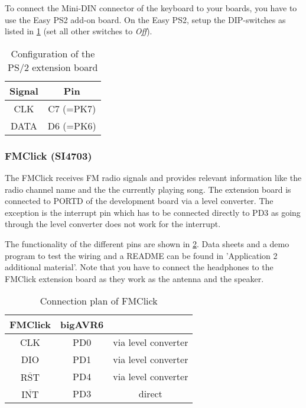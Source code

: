 \documentclass[a4paper,10pt]{article}
\begin{document}
To connect the Mini-DIN connector of the keyboard to your boards, you
	have to use the Easy PS2 add-on board.
On the Easy PS2, setup the DIP-switches as
	listed in \cref{tab:pinout_ps2} (set
	all other switches to \textit{Off}).

\begin{table}[ht]
	\centering

	\begin{tabular}{|c|c|}
		\hline
		Signal & Pin\\
		\hline
		CLK      & C7 (=PK7) \\
		DATA     & D6 (=PK6) \\
		\hline
	\end{tabular}

	\caption{Configuration of the PS/2 extension board}
	\label{tab:pinout_ps2}
\end{table}

\subsubsection{FMClick (SI4703)}

The FMClick receives FM radio signals and provides relevant information like the radio channel name and the the currently playing song.
The extension board is connected to PORTD of the development board via a level converter. The exception is the interrupt pin which has to be connected directly to PD3 as going through the level converter does not work for the interrupt.

The functionality of the different pins are 
	shown in \cref{tab:pinout_fmclick}.
Data sheets and a demo program to test the wiring and a README can be found in 'Application 2 additional material'.
Note that you have to connect the headphones to the FMClick extension board as they work as the antenna and the speaker.

\begin{table}[h]
	\centering

	\begin{tabular}{|c|c|c|}
		\hline
		FMClick & bigAVR6 &\\
		\hline
		CLK      & PD0 & via level converter\\
		DIO     & PD1& via level converter \\
		$\overline{\text{RST}}$ & PD4 & via level converter \\
		$\overline{\text{INT}}$ & PD3 & direct\\
		\hline
	\end{tabular}
	\caption{Connection plan of FMClick}
	\label{tab:pinout_fmclick}
\end{table}
\end{document}
